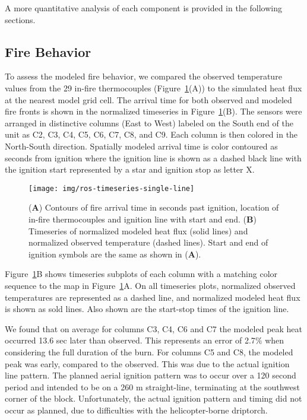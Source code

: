 \documentclass[preprints,article,accept,moreauthors,pdftex]{Definitions/mdpi}
\begin{document}
A more quantitative analysis of each component is provided in the following sections.

\subsection{Fire Behavior}

To assess the modeled fire behavior, we compared the observed temperature values from the 29 in-fire thermocouples (Figure~\ref{fig2}(A)) to the simulated heat flux at the nearest model grid cell. The arrival time for both observed and modeled fire fronts is shown in the normalized timeseries in Figure~\ref{fig2}(B).
The sensors were arranged in distinctive columns (East to West) labeled on the South end of the unit as C2, C3, C4, C5, C6, C7, C8, and C9. Each column is then colored in the North-South direction. Spatially modeled arrival time is color contoured as seconds from ignition where the ignition line is shown as a dashed black line with the ignition start represented by a star and ignition stop as letter X.

\begin{figure}[H]
\centering
 \texttt{[image: img/ros-timeseries-single-line]}
 \caption{(\textbf{A}) Contours of fire arrival time in seconds past ignition, location of in-fire thermocouples and ignition line with start and end. (\textbf{B}) Timeseries of normalized modeled heat flux (solid lines) and normalized observed temperature (dashed lines). Start and end of ignition symbols are the same as shown in (\textbf{A}). \label{fig2}}
 \end{figure}

Figure~\ref{fig2}B shows timeseries subplots of each column with a matching color sequence to the map in Figure~\ref{fig2}A. On all timeseries plots, normalized observed temperatures are represented as a dashed line, and normalized modeled heat flux is shown as sold lines. Also shown are the start-stop times of the ignition line.

We found that on average for columns C3, C4, C6 and C7 the modeled peak heat occurred 13.6 sec later than observed. This represents an error of 2.7$\%$ when considering the full duration of the burn. For columns C5 and C8, the modeled peak was early, compared to the observed. This was due to the actual ignition line pattern. The planned aerial ignition pattern was to occur over a 120 second period and intended to be on a 260 m straight-line, terminating at the southwest corner of the block. Unfortunately, the actual ignition pattern and timing did not occur as planned, due to difficulties with the helicopter-borne driptorch.
\end{document}
